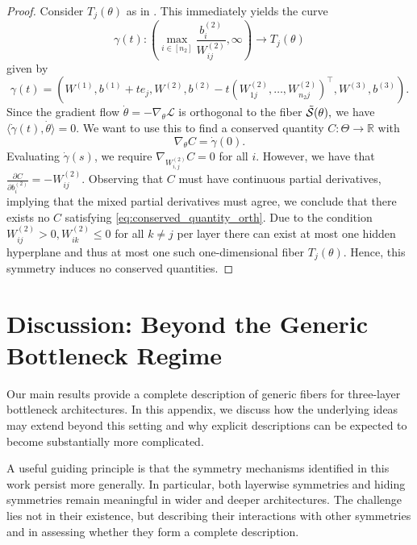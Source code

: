 \documentclass{article}
\theoremstyle{definition}
\newcommand{\R}{\mathbb{R}}
\newcommand{\weights}[1]{W^{(#1)}}
\newcommand{\bias}[1]{b^{(#1)}}
\newcommand{\gfiber}[1]{\Tilde{\mathcal{S}}({#1})}
\begin{document}
\begin{proof} 
Consider $T_j(\theta)$ as in . 
This immediately yields the curve 
$$
\gamma(t):(\max_{i \in [n_2]} \frac{\bias{2}_i}{\weights{2}_{i j}}, \infty)\rightarrow T_j(\theta)
$$ 
given by 
$$\gamma(t)=(\weights{1},
\bias{1}+t e_j,
\weights{2},
\bias{2}-t(\weights{2}_{1j},\ldots,\weights{2}_{n_2 j})^\top,
\weights{3},\bias{3}). 
$$
Since the gradient flow $\dot{\theta}=-\nabla_\theta\mathcal{L}$ is orthogonal to the fiber $\gfiber{\theta},$ we have $\langle\dot{\gamma}(t),\dot{\theta}\rangle=0$. 
%
We want to use this to find a conserved quantity $C:\Theta\rightarrow\R$ with 
\begin{equation}
\label{eq:conserved_quantity_orth}
\nabla_\theta C=\dot{\gamma}(0). 
\end{equation}
Evaluating $\dot{\gamma}(s)$, we require $\nabla_{\weights{2}_{i,j}}C=0$ for all $i$. 
However, we have that $\frac{\partial C}{\partial\bias{2}_{i}}=-\weights{2}_{ij}$. 
Observing that $C$ must have continuous partial derivatives, implying that the mixed partial derivatives must agree, we conclude that there exists no $C$ satisfying \eqref{eq:conserved_quantity_orth}. 
%
Due to the condition $\weights{2}_{ij}>0,\weights{2}_{ik}\leq0$ for all $k\neq j$ per layer there can exist at most one hidden hyperplane and thus at most one such one-dimensional fiber $T_j(\theta)$. 
Hence, this symmetry induces no conserved quantities. 
\end{proof} 


\section{Discussion: Beyond the Generic Bottleneck Regime}
\label{app:discussion_beyond_bottleneck} 

Our main results provide a complete description of generic fibers for three-layer bottleneck architectures. 
In this appendix, we discuss how the underlying ideas may extend beyond this setting and why explicit descriptions can be expected to become substantially more complicated. 

A useful guiding principle is that the symmetry mechanisms identified in this work persist more generally. 
In particular, both layerwise symmetries and hiding symmetries remain meaningful in wider and deeper architectures. 
The challenge lies not in their existence, but describing their interactions with other symmetries and in assessing whether they form a complete description. 
\end{document}
